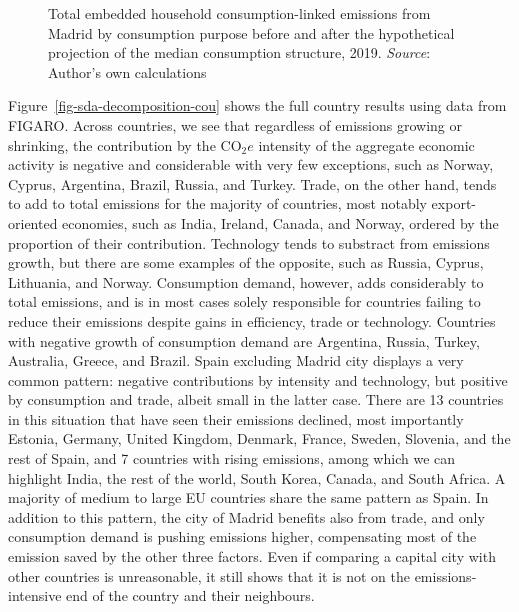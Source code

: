 \documentclass[
  10pt,
  twocolumn]{aft}
\begin{document}
\begin{figure}


\caption{\label{fig-cf-coicopCO2}Total embedded household
consumption-linked emissions from Madrid by consumption purpose before
and after the hypothetical projection of the median consumption
structure, 2019. \emph{Source}: Author's own calculations}

\end{figure}%

Figure~\ref{fig-sda-decomposition-cou} shows the full country results
using data from FIGARO. Across countries, we see that regardless of
emissions growing or shrinking, the contribution by the \(\text{CO}_2e\)
intensity of the aggregate economic activity is negative and
considerable with very few exceptions, such as Norway, Cyprus,
Argentina, Brazil, Russia, and Turkey. Trade, on the other hand, tends
to add to total emissions for the majority of countries, most notably
export-oriented economies, such as India, Ireland, Canada, and Norway,
ordered by the proportion of their contribution. Technology tends to
substract from emissions growth, but there are some examples of the
opposite, such as Russia, Cyprus, Lithuania, and Norway. Consumption
demand, however, adds considerably to total emissions, and is in most
cases solely responsible for countries failing to reduce their emissions
despite gains in efficiency, trade or technology. Countries with
negative growth of consumption demand are Argentina, Russia, Turkey,
Australia, Greece, and Brazil. Spain excluding Madrid city displays a
very common pattern: negative contributions by intensity and technology,
but positive by consumption and trade, albeit small in the latter case.
There are 13 countries in this situation that have seen their emissions
declined, most importantly Estonia, Germany, United Kingdom, Denmark,
France, Sweden, Slovenia, and the rest of Spain, and 7 countries with
rising emissions, among which we can highlight India, the rest of the
world, South Korea, Canada, and South Africa. A majority of medium to
large EU countries share the same pattern as Spain. In addition to this
pattern, the city of Madrid benefits also from trade, and only
consumption demand is pushing emissions higher, compensating most of the
emission saved by the other three factors. Even if comparing a capital
city with other countries is unreasonable, it still shows that it is not
on the emissions-intensive end of the country and their neighbours.
\end{document}
